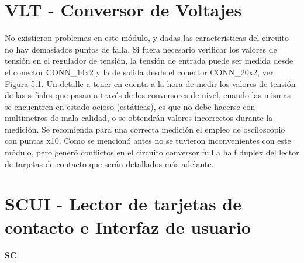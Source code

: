 \section{VLT - Conversor de Voltajes}
No existieron problemas en este módulo, y dadas las características del circuito
no hay demasiados puntos de falla. Si fuera necesario verificar los valores de
tensión en el regulador de tensión, la tensión de entrada puede ser medida desde
el conector CONN\_14x2 y la de salida desde el conector CONN\_20x2, ver Figura 5.1.
Un detalle a tener en cuenta a la hora de medir los valores de tensión de las
señales que pasan a través de los conversores de nivel, cuando las mismas se 
encuentren en estado ocioso (estáticas), es que no debe hacerse con multímetros 
de mala calidad, o se obtendrán valores incorrectos durante la medición. Se 
recomienda para una correcta medición el empleo de osciloscopio con puntas x10. 
Como se mencionó antes no se tuvieron inconvenientes con este módulo, pero generó 
conflictos en el circuito conversor full a half duplex del lector de tarjetas de 
contacto que serán detallados más adelante.


\section{SCUI - Lector de tarjetas de contacto e Interfaz de usuario}

{\bf{SC}}

